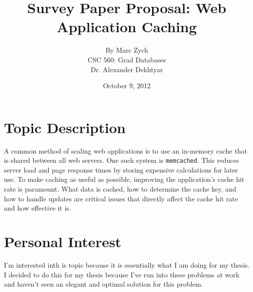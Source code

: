 \documentclass[12pt]{article}
\begin{document}
\title{\vfill Survey Paper Proposal: Web Application Caching}

\author{
By Marc Zych \vspace{10pt} \\
CSC 560: Grad Databases \vspace{10pt} \\
Dr. Alexander Dekhtyar \vspace{10pt} \\
}
\date{October 9, 2012}

\maketitle


\thispagestyle{empty}
\newpage



\section{Topic Description}
A common method of scaling web applications is to use an in-memory cache that is shared between all web servers.
One such system is \texttt{memcached}.
This reduces server load and page response times by storing expensive calculations for later use.
To make caching as useful as possible, improving the application's cache hit rate is paramount.
What data is cached, how to determine the cache key, and how to handle updates are critical issues that directly affect the cache hit rate and how effective it is.

\section{Personal Interest}
I'm interested inth is topic because it is essentially what I am doing for my thesis.
I decided to do this for my thesis because I've run into these problems at work and haven't seen an elegant and optimal solution for this problem.


\newpage
\nocite{*}


\end{document}
